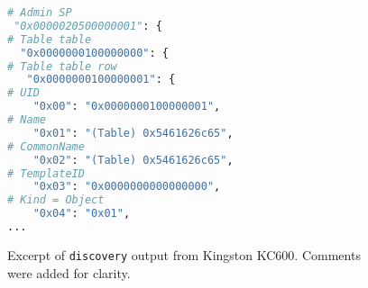 \begin{figure}
    \centering
\begin{lstlisting}[language=Python]
# Admin SP
 "0x0000020500000001": {
# Table table
  "0x0000000100000000": {
# Table table row
   "0x0000000100000001": {
# UID
    "0x00": "0x0000000100000001",
# Name
    "0x01": "(Table) 0x5461626c65",
# CommonName
    "0x02": "(Table) 0x5461626c65",
# TemplateID
    "0x03": "0x0000000000000000",
# Kind = Object
    "0x04": "0x01",
...
\end{lstlisting}
    \caption{Excerpt of \texttt{discovery} output from Kingston KC600. Comments were added for clarity.}
    \label{fig:discovery_example}
\end{figure}


















